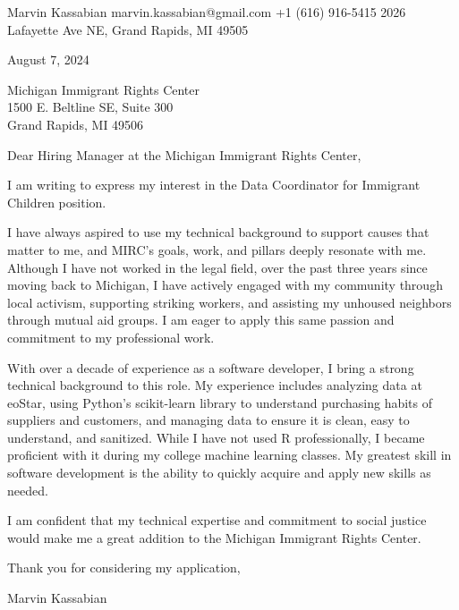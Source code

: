 \documentclass{../styles/coverletter}
\begin{document}
\resumeheadersimpler
{Marvin Kassabian}
{marvin.kassabian@gmail.com}
{+1 (616) 916-5415}
{2026 Lafayette Ave NE, Grand Rapids, MI 49505}

August 7, 2024

Michigan Immigrant Rights Center\\
1500 E. Beltline SE, Suite 300\\
Grand Rapids, MI 49506

Dear Hiring Manager at the Michigan Immigrant Rights Center,\newline

I am writing to express my interest in the Data Coordinator for Immigrant Children position.\newline

I have always aspired to use my technical background to support causes that matter to me, and MIRC's goals, work, and pillars deeply resonate with me. Although I have not worked in the legal field, over the past three years since moving back to Michigan, I have actively engaged with my community through local activism, supporting striking workers, and assisting my unhoused neighbors through mutual aid groups. I am eager to apply this same passion and commitment to my professional work.\newline

With over a decade of experience as a software developer, I bring a strong technical background to this role. My experience includes analyzing data at eoStar, using Python’s scikit-learn library to understand purchasing habits of suppliers and customers, and managing data to ensure it is clean, easy to understand, and sanitized. While I have not used R professionally, I became proficient with it during my college machine learning classes. My greatest skill in software development is the ability to quickly acquire and apply new skills as needed.\newline

I am confident that my technical expertise and commitment to social justice would make me a great addition to the Michigan Immigrant Rights Center.\newline

Thank you for considering my application,

Marvin Kassabian
\end{document}
